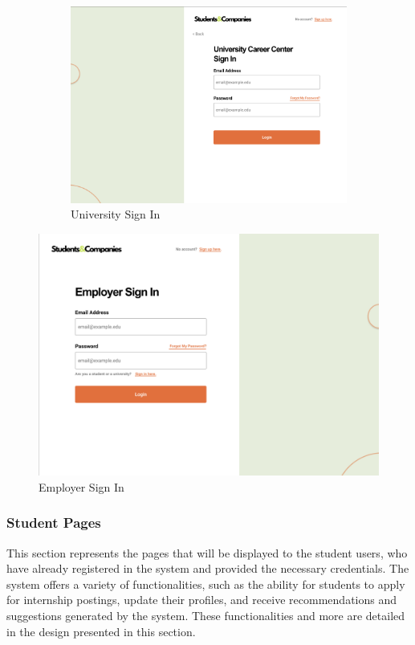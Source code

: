 \documentclass[a4paper,12pt]{article}
\begin{document}
\begin{figure}[H]
    \centering
\begin{figure}[H]
    \centering
    \includegraphics[scale = 0.40]{figures/UserInterfaces/General/UniversitySignIn.png}
    \caption{University Sign In}
     \centering
\end{figure}
    \includegraphics[scale = 0.40]{figures/UserInterfaces/General/EmployerSignIn.png}
    \caption{Employer Sign In}
     \centering
\end{figure}

\newpage
\subsubsection*{Student Pages}
This section represents the pages that will be displayed to the student users, who have already registered in the system and provided the necessary credentials. The system offers a variety of functionalities, such as the ability for students to apply for internship postings, update their profiles, and receive recommendations and suggestions generated by the system. These functionalities and more are detailed in the design presented in this section.
\end{document}
